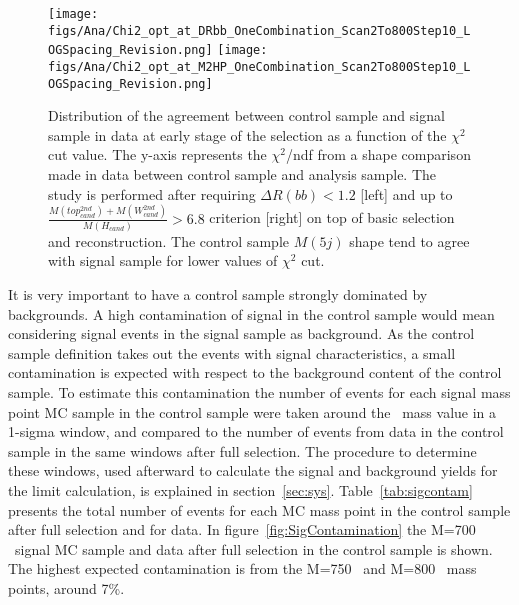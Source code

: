 \begin{figure}[!Hhtbp]
  \begin{center}
    \texttt{[image: figs/Ana/Chi2\_opt\_at\_DRbb\_OneCombination\_Scan2To800Step10\_LOGSpacing\_Revision.png]} %
    \texttt{[image: figs/Ana/Chi2\_opt\_at\_M2HP\_OneCombination\_Scan2To800Step10\_LOGSpacing\_Revision.png]}
    \caption{Distribution of the agreement between control sample and signal sample in data at early stage of the selection as a function of the $\chi^2$ cut value. The y-axis represents the $\chi^{2}$/ndf from a shape comparison made in data between control sample and analysis sample. The study is performed after requiring $\Delta R(bb) <1.2$ [left] and up to $\frac{M(top^{2nd}_{cand})+M(W^{2nd}_{cand})}{M(H_{cand})}>6.8$ criterion [right] on top of basic selection and reconstruction. The control sample $M(5j)$ shape tend to agree with signal sample for lower values of $\chi^2$ cut.}
    \label{fig:optchi2}
  \end{center}
\end{figure}

It is very important to have a control sample strongly dominated by backgrounds. A high contamination of signal in the control sample would mean considering signal events in the signal sample as background. As the control sample definition takes out the events with signal characteristics, a small contamination is expected with respect to the background content of the control sample. To estimate this contamination the number of events for each signal mass point MC sample in the control sample were taken around the \Tp~mass value in a 1-sigma window, and compared to the number of events from data in the control sample in the same windows after full selection. The procedure to determine these windows, used afterward to calculate the signal and background yields for the limit calculation, is explained in section~\ref{sec:sys}. Table~\ref{tab:sigcontam} presents the total number of events for each MC mass point in the control sample after full selection and for data. In figure~\ref{fig:SigContamination} the M=700 \GeVcc~signal MC sample and data after full selection in the control sample is shown. The highest expected contamination is from the M=750 \GeVcc~and M=800 \GeVcc~mass points, around 7\%. %

